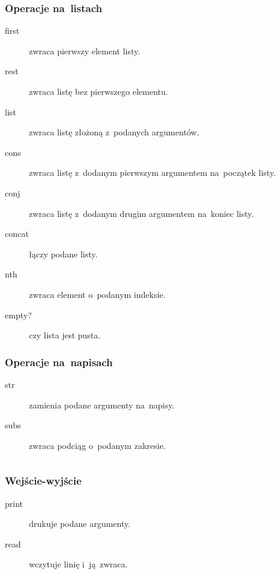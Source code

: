 \documentclass[a4paper,11pt]{article}
\newcommand{\clj}[1]{\inputminted[fontsize=\footnotesize]{clojure}{code/#1.clj}}
\begin{document}
\subsubsection{Operacje na~listach}

\begin{description}
\item[first] zwraca pierwszy element listy.

\item[rest] zwraca listę bez pierwszego elementu.

\item[list] zwraca listę złożoną z~podanych argumentów.

\item[cons] zwraca listę z~dodanym pierwszym argumentem na~początek listy.

\item[conj] zwraca listę z~dodanym drugim argumentem na~koniec listy.

\item[concat] łączy podane listy.

\item[nth] zwraca element o~podanym indeksie.

\item[empty?] czy lista jest pusta.

\end{description}

\subsubsection{Operacje na~napisach}

\begin{description}
\item[str] zamienia podane argumenty na~napisy.

\item[subs] zwraca podciąg o~podanym zakresie.
  \clj{subs}
\end{description}

\subsubsection{Wejście-wyjście}

\begin{description}
\item[print] drukuje podane argumenty.
\item[read] wczytuje linię i~ją~zwraca.
\end{description}
\end{document}
